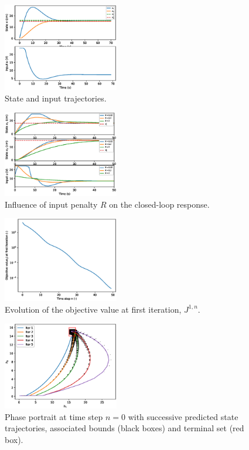 \documentclass[a4paper, 10 pt, conference]{IEEEconf}
\begin{document}
\begin{figure}[h]
    \centering
    \includegraphics[width=0.45\textwidth]{img/tmpc1.eps} %
    \caption{State and input trajectories.}
    \label{fig:tmpc1}
\end{figure}

\begin{figure}[h]
    \centering
    \includegraphics[width=0.45\textwidth]{img/tmpc2.eps} %
    \caption{Influence of input penalty $R$ on the closed-loop response.}
    \label{fig:tmpc2}
\end{figure}

\begin{figure}[h]
    \centering
    \includegraphics[width=0.45\textwidth]{img/tmpc3.eps} %
    \caption{Evolution of the objective value at first iteration, $J^{1,n}$.}
    \label{fig:tmpc3}
\end{figure}

\begin{figure}[h]
    \centering
    \includegraphics[width=0.45\textwidth]{img/tmpc4.eps} %
    \caption{Phase portrait at time step $n=0$ with successive predicted state trajectories, associated bounds (black boxes) and terminal set (red box).}
    \label{fig:tmpc4}
\end{figure}
\end{document}
